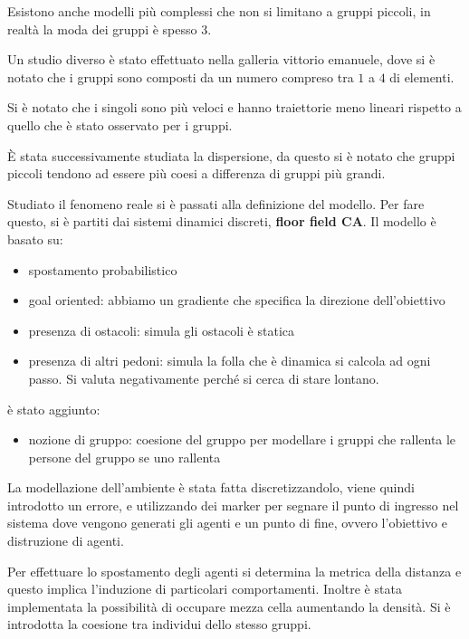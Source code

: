 
Esistono anche modelli più complessi che non si limitano a gruppi piccoli, in realtà
la moda dei gruppi è spesso $3$. %

Un studio diverso è stato effettuato nella galleria vittorio emanuele, dove si è
notato che i gruppi sono composti da un numero compreso tra $1$ a $4$ di elementi.

Si è notato che i singoli sono più veloci e hanno traiettorie meno lineari rispetto
a quello che è stato osservato per i gruppi.

È stata successivamente studiata la dispersione, da questo si è notato che gruppi
piccoli tendono ad essere più coesi a differenza di gruppi più grandi.

Studiato il fenomeno reale si è passati alla definizione del modello. Per fare
questo, si è partiti dai sistemi dinamici discreti, \textbf{floor field CA}. Il
modello è basato su:
\begin{itemize}
    \item spostamento probabilistico
    \item goal oriented: abbiamo un gradiente che specifica la direzione dell'obiettivo
    \item presenza di ostacoli: simula gli ostacoli è statica
    \item presenza di altri pedoni: simula la folla che è dinamica si calcola ad
          ogni passo. Si valuta negativamente perché si cerca di stare lontano.
\end{itemize}
è stato aggiunto:
\begin{itemize}
    \item nozione di gruppo: coesione del gruppo per modellare i gruppi che
          rallenta le persone del gruppo se uno rallenta
\end{itemize}
La modellazione dell'ambiente è stata fatta discretizzandolo, viene quindi
introdotto un errore, e utilizzando dei marker per segnare il punto di ingresso
nel sistema  dove vengono generati gli agenti e un punto di fine, ovvero
l'obiettivo e distruzione di agenti.

Per effettuare lo spostamento degli agenti si determina la metrica della distanza
e questo implica l'induzione di particolari comportamenti. Inoltre è stata implementata
la possibilità di occupare mezza cella aumentando la densità. Si è introdotta la
coesione tra individui dello stesso gruppi.

